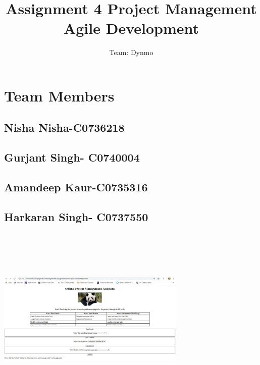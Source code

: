 \documentclass{article}
\title{Assignment 4 Project Management Agile Development}
\author{Team: Dynmo }
\begin{document}
\maketitle
\section{Team Members}
\subsection{Nisha Nisha-C0736218}  
\subsection{Gurjant Singh- C0740004}
\subsection{Amandeep Kaur-C0735316}
\subsection{Harkaran Singh- C0737550}

\centering
\includegraphics[width=9cm, height=9cm]{html page panda.JPG}
\end{document}
